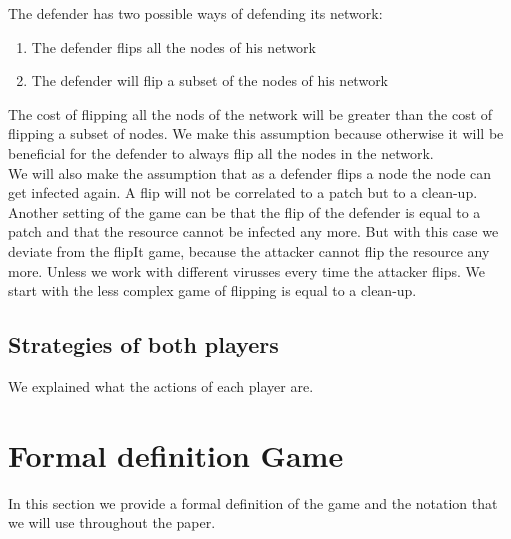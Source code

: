The defender has two possible ways of defending its network:
\begin{enumerate}
\item The defender flips all the nodes of his network
\item The defender will flip a subset of the nodes of his network
\end{enumerate}

The cost of flipping all the nods of the network will be greater than the cost of flipping a subset of nodes. We make this assumption because otherwise it will be beneficial for the defender to always flip all the nodes in the network.\\

We will also make the assumption that as a defender flips a node the node can get infected again. A flip will not be  correlated to a patch but to a clean-up. 
 Another setting of the game can be that the flip of the defender is equal to a patch and that the resource cannot be infected any more. But with this case we deviate from the flipIt game, because the attacker cannot flip the resource any more. Unless we work with different virusses every time the attacker flips. We start with the less complex game of flipping is equal to a clean-up.

\subsection{Strategies of both players}
We explained what the actions of each player are. 

\section{Formal definition Game}

In this section we provide a formal definition of the game and the notation that we will use throughout the paper. 

